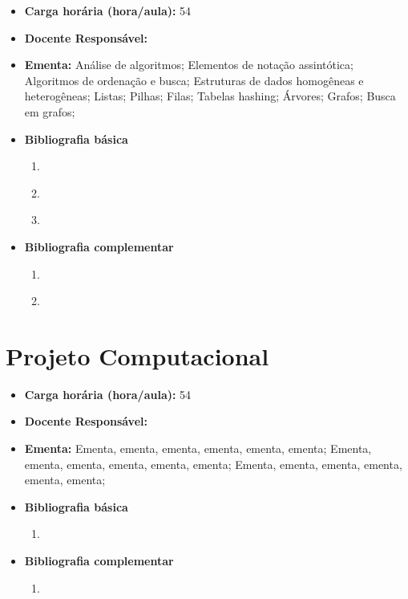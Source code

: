 \documentclass[11pt,fleqn]{book} %
\begin{document}
\begin{itemize}
	\item \textbf{Carga horária (hora/aula):} 54
	\item \textbf{Docente Responsável:}~
	\item \textbf{Ementa:} 
	Análise de algoritmos; 
	Elementos de notação assintótica;
	Algoritmos de ordenação e busca;
	Estruturas de dados homogêneas e heterogêneas;
	Listas;
	Pilhas;
	Filas;
	Tabelas hashing;
	Árvores;
	Grafos;
	Busca em grafos;	
	\item \textbf{Bibliografia básica}
	\begin{enumerate}
		\item \cite{ascencio2010estruturas}
		\item \cite{cormen2002algoritmos}
		\item \cite{silva2007estrutura}
	\end{enumerate}
	\item \textbf{Bibliografia complementar}
	\begin{enumerate}
		\item \cite{szwarcfiter1994estruturas}	
		\item \cite{lafore2004estruturas}	
	\end{enumerate}	
\end{itemize}


\newpage
\section{Projeto Computacional}\label{disc:projcomp}

\begin{itemize}
	\item \textbf{Carga horária (hora/aula):} 54
	\item \textbf{Docente Responsável:}~
	\item \textbf{Ementa:} 
	Ementa, ementa, ementa, ementa, ementa, ementa;
	Ementa, ementa, ementa, ementa, ementa, ementa;
	Ementa, ementa, ementa, ementa, ementa, ementa;	
	\item \textbf{Bibliografia básica}
	\begin{enumerate}
		\item 
	\end{enumerate}
	\item \textbf{Bibliografia complementar}
	\begin{enumerate}
		\item 	
	\end{enumerate}	
\end{itemize}
\end{document}
